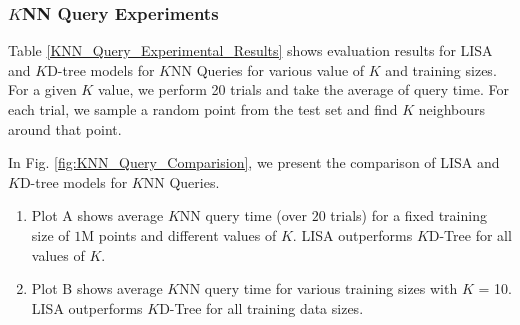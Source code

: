 \subsubsection {$K$NN Query Experiments}
Table \ref{KNN_Query_Experimental_Results} shows evaluation results for LISA and $K$D-tree models for $K$NN Queries for various value of $K$ and training sizes. For a given $K$ value, we perform 20 trials and take the average of query time. For each trial, we sample a random point from the test set and find $K$ neighbours around that point.

	In Fig. \ref{fig:KNN_Query_Comparision}, we present the comparison of LISA and $K$D-tree models for $K$NN Queries.
	\begin{enumerate}
		\item Plot A shows average $K$NN query time (over $20$ trials) for a fixed training size of $1$M points and different values of $K$. LISA outperforms $K$D-Tree for all values of $K$.
		
		\item Plot B shows average $K$NN query time for various training sizes with $K$ = 10. LISA outperforms $K$D-Tree for all training data sizes.
	\end{enumerate}



